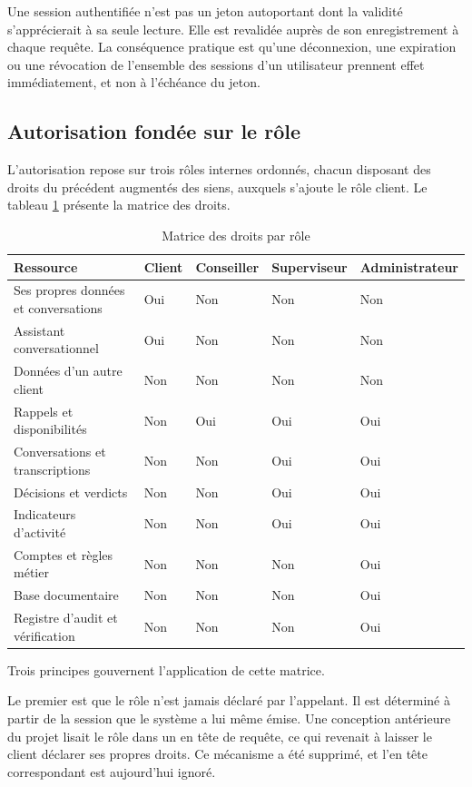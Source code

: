 Une session authentifiée n'est pas un jeton autoportant dont la validité s'apprécierait à sa seule lecture. Elle est revalidée auprès de son enregistrement à chaque requête. La conséquence pratique est qu'une déconnexion, une expiration ou une révocation de l'ensemble des sessions d'un utilisateur prennent effet immédiatement, et non à l'échéance du jeton.

\subsection{Autorisation fondée sur le rôle}

L'autorisation repose sur trois rôles internes ordonnés, chacun disposant des droits du précédent augmentés des siens, auxquels s'ajoute le rôle client. Le tableau \ref{tab:rbac} présente la matrice des droits.

\begin{table}[H]
\centering
\renewcommand{\arraystretch}{1.2}
\begin{tabular}{|p{5.1cm}|p{1.9cm}|p{2.2cm}|p{2.2cm}|p{2.2cm}|}
\hline
\textbf{Ressource} & \textbf{Client} & \textbf{Conseiller} & \textbf{Super\-viseur} & \textbf{Admini\-strateur} \\
\hline
Ses propres données et conversations & Oui & Non & Non & Non \\
\hline
Assistant conversationnel & Oui & Non & Non & Non \\
\hline
Données d'un autre client & Non & Non & Non & Non \\
\hline
Rappels et disponibilités & Non & Oui & Oui & Oui \\
\hline
Conversations et transcriptions & Non & Non & Oui & Oui \\
\hline
Décisions et verdicts & Non & Non & Oui & Oui \\
\hline
Indicateurs d'activité & Non & Non & Oui & Oui \\
\hline
Comptes et règles métier & Non & Non & Non & Oui \\
\hline
Base documentaire & Non & Non & Non & Oui \\
\hline
Registre d'audit et vérification & Non & Non & Non & Oui \\
\hline
\end{tabular}
\caption{Matrice des droits par rôle}
\label{tab:rbac}
\end{table}

Trois principes gouvernent l'application de cette matrice.

Le premier est que le rôle n'est jamais déclaré par l'appelant. Il est déterminé à partir de la session que le système a lui même émise. Une conception antérieure du projet lisait le rôle dans un en tête de requête, ce qui revenait à laisser le client déclarer ses propres droits. Ce mécanisme a été supprimé, et l'en tête correspondant est aujourd'hui ignoré.

